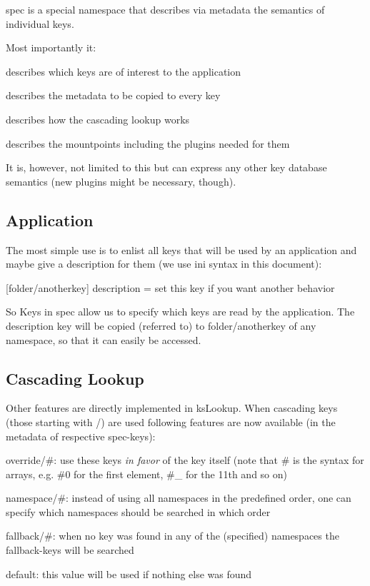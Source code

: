 spec is a special namespace that describes via metadata the semantics of individual keys.

Most importantly it\+:


\begin{DoxyEnumerate}
\item describes which keys are of interest to the application
\item describes the metadata to be copied to every key
\item describes how the cascading lookup works
\item describes the mountpoints including the plugins needed for them
\end{DoxyEnumerate}

It is, however, not limited to this but can express any other key database semantics (new plugins might be necessary, though).

\subsection*{Application}

The most simple use is to enlist all keys that will be used by an application and maybe give a description for them (we use ini syntax in this document)\+:


\begin{DoxyCode}
[mykey]

[folder/anotherkey]
description = set this key if you want another behavior
\end{DoxyCode}


So Keys in {\ttfamily spec} allow us to specify which keys are read by the application. The description key will be copied (referred to) to {\ttfamily folder/anotherkey} of any namespace, so that it can easily be accessed.

\subsection*{Cascading Lookup}

Other features are directly implemented in {\ttfamily ks\+Lookup}. When cascading keys (those starting with {\ttfamily /}) are used following features are now available (in the metadata of respective {\ttfamily spec}-\/keys)\+:


\begin{DoxyItemize}
\item {\ttfamily override/\#}\+: use these keys {\itshape in favor} of the key itself (note that {\ttfamily \#} is the syntax for arrays, e.\+g. {\ttfamily \#0} for the first element, {\ttfamily \#\+\_} for the 11th and so on)
\item {\ttfamily namespace/\#}\+: instead of using all namespaces in the predefined order, one can specify which namespaces should be searched in which order
\item {\ttfamily fallback/\#}\+: when no key was found in any of the (specified) namespaces the {\ttfamily fallback}-\/keys will be searched
\item {\ttfamily default}\+: this value will be used if nothing else was found
\end{DoxyItemize}

